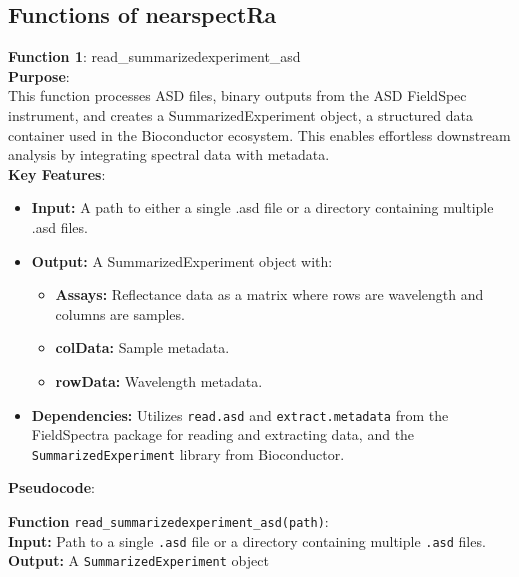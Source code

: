 \documentclass[12pt,a4paper]{article}
\begin{document}
\subsection{Functions of nearspectRa}
\textbf{Function 1}: read_summarizedexperiment_asd \\
\textbf{Purpose}: \\
This function processes ASD files, binary outputs from the ASD FieldSpec instrument, and creates a SummarizedExperiment object, a structured data container used in the Bioconductor ecosystem. This enables effortless downstream analysis by integrating spectral data with metadata. \\
\textbf{Key Features}: \\
\begin{itemize}
    \item \textbf{Input:} A path to either a single .asd file or a directory containing multiple .asd files.
    \item \textbf{Output:} A SummarizedExperiment object with: 
    \begin{itemize}
        \item \textbf{Assays:} Reflectance data as a matrix where rows are wavelength and columns are samples.
        \item \textbf{colData:} Sample metadata.
        \item \textbf{rowData:} Wavelength metadata.
    \end{itemize}
    \item \textbf{Dependencies:} Utilizes \texttt{read.asd} and \texttt{extract.metadata} from the FieldSpectra package for reading and extracting data, and the \texttt{SummarizedExperiment} library from Bioconductor.
\end{itemize}

\textbf{Pseudocode}:

\textbf{Function} \texttt{read\_summarizedexperiment\_asd(path)}: \\ 
\hspace*{2em}\textbf{Input:} Path to a single \texttt{.asd} file or a directory containing multiple \texttt{.asd} files. \\  
\hspace*{2em}\textbf{Output:} A \texttt{SummarizedExperiment} object  
\end{document}
